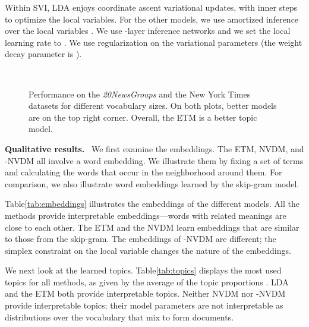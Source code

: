 \documentclass[11pt,a4paper]{article}
\DeclareRobustCommand{\parhead}[1]{\noindent\textbf{#1}~}
\begin{document}
Within \gls{SVI}, \gls{LDA} enjoys coordinate ascent variational
updates, with  inner steps to optimize the local variables.  For
the other models, we use amortized inference over the local variables
.  We use -layer inference networks and we set the local
learning rate to . We use  regularization on the
variational parameters (the weight decay parameter is
).


\begin{figure*}[t]
  \centering
   \\
  \caption{Performance on the \emph{20NewsGroups} and the New York
    Times datasets for different vocabulary sizes. On both plots,
    better models are on the top right corner. Overall, the \gls{ETM}
    is a better topic model.}
  \label{fig:scatter}
\end{figure*}

\parhead{Qualitative results.}  We first examine the embeddings.  The
\gls{ETM}, \gls{NVDM}, and -\gls{NVDM} all involve a word
embedding.  We illustrate them by fixing a set of terms and
calculating the words that occur in the neighborhood around them.  For
comparison, we also illustrate word embeddings learned by the
skip-gram model.

Table\nobreakspace \ref {tab:embeddings} illustrates the embeddings of the different
models.  All the methods provide interpretable embeddings---words with
related meanings are close to each other. The \gls{ETM} and the
\gls{NVDM} learn embeddings that are similar to those from the
skip-gram.  The embeddings of -\gls{NVDM} are different; the
simplex constraint on the local variable changes the nature of the
embeddings.

We next look at the learned topics. Table\nobreakspace \ref {tab:topics} displays the 
most used topics for all methods, as given by the average of the topic
proportions .  \gls{LDA} and the \gls{ETM} both provide
interpretable topics.  Neither \gls{NVDM} nor -\gls{NVDM}
provide interpretable topics; their model parameters  
are not interpretable as distributions over the vocabulary that mix to form documents.
\end{document}

